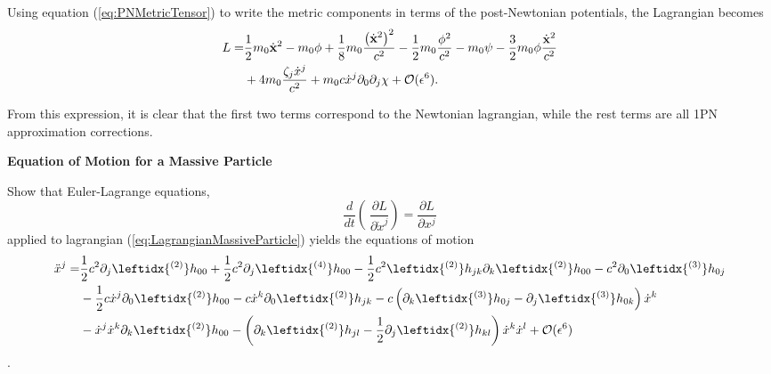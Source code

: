 Using equation (\ref{eq:PNMetricTensor}) to write the metric components in terms of the post-Newtonian potentials, the Lagrangian becomes
\begin{align}
L = &\frac{1}{2} m_0 \dot{\textbf{x}} ^2 - m_0 \phi + \frac{1}{8} m_0 \frac{\left( \dot{\textbf{x}} ^2 \right)^2}{c^2} - \frac{1}{2} m_0 \frac{\phi^2}{c^2} - m_0 \psi -  \frac{3}{2} m_0 \phi \frac{\dot{\textbf{x}} ^2 }{c^2} \notag \\
&+ 4 m_0 \frac{ \zeta_j \dot{x}^j }{c^2} + m_0 c \dot{x}^j \partial_0 \partial_j \chi + \mathcal{O} ( \epsilon^6 ).  \label{eq:LagrangianMassiveParticlePotentials}
\end{align}

From this expression, it is clear that the first two terms correspond to the Newtonian lagrangian, while the rest terms are all 1PN approximation corrections.  

\begin{exercise}
\textbf{Equation of Motion for a Massive Particle}

Show that Euler-Lagrange equations,
\begin{equation}
\frac{d}{dt}\left(\ \frac{\partial L}{\partial \dot{x}^j} \right) =   \frac{\partial L}{\partial x^j} 
\end{equation}
applied to lagrangian (\ref{eq:LagrangianMassiveParticle}) yields the equations of motion
\begin{align}
\ddot{x}^j = &\frac{1}{2} c^2 \partial_j \leftidx{^{(2)}} h_{00} + \frac{1}{2} c^2 \partial_j \leftidx{^{(4)}} h_{00} - \frac{1}{2} c^2 \leftidx{^{(2)}} h_{jk} \partial_k \leftidx{^{(2)}} h_{00}  - c^2 \partial_0 \leftidx{^{(3)}} h_{0j} \notag \\ 
&- \frac{1}{2} c \dot{x}^j \partial_0 \leftidx{^{(2)}} h_{00}  - c \dot{x}^k \partial_0 \leftidx{^{(2)}} h_{jk}  - c \left( \partial_k \leftidx{^{(3)}} h_{0j} - \partial_j \leftidx{^{(3)}} h_{0k}   \right)\dot{x}^k \notag \\
&- \dot{x}^j \dot{x}^k \partial_k \leftidx{^{(2)}} h_{00}  - \left( \partial_k \leftidx{^{(2)}} h_{jl} - \frac{1}{2} \partial_j \leftidx{^{(2)}} h_{kl} \right) \dot{x}^k \dot{x}^l + \mathcal{O} ( \epsilon^6 )
\end{align} \label{eq:EoMMassiveParticle}.
\end{exercise}

